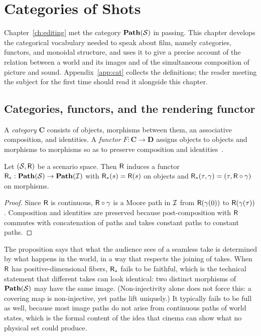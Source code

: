 \chapter{Categories of Shots}
\label{ch:categories}

Chapter~\ref{ch:editing} met the category $\mathbf{Path}(\mathcal{S})$ in passing. This chapter develops the categorical vocabulary needed to speak about film, namely categories, functors, and monoidal structure, and uses it to give a precise account of the relation between a world and its images and of the simultaneous composition of picture and sound. Appendix~\ref{app:cat} collects the definitions; the reader meeting the subject for the first time should read it alongside this chapter.

\section{Categories, functors, and the rendering functor}

A \emph{category} $\mathbf{C}$ consists of objects, morphisms between them, an associative composition, and identities. A \emph{functor} $F:\mathbf{C}\to\mathbf{D}$ assigns objects to objects and morphisms to morphisms so as to preserve composition and identities~\cite{maclane1998}.

\begin{proposition}\label{prop:rendering-functor}
Let $(\mathcal{S},\mathsf{R})$ be a scenario space. Then $\mathsf{R}$ induces a functor $\mathsf{R}_*:\mathbf{Path}(\mathcal{S})\to\mathbf{Path}(\mathcal{I})$ with $\mathsf{R}_*(s)=\mathsf{R}(s)$ on objects and $\mathsf{R}_*(\tau,\gamma)=(\tau,\mathsf{R}\circ\gamma)$ on morphisms.
\end{proposition}

\begin{proof}
Since $\mathsf{R}$ is continuous, $\mathsf{R}\circ\gamma$ is a Moore path in $\mathcal{I}$ from $\mathsf{R}(\gamma(0))$ to $\mathsf{R}(\gamma(\tau))$. Composition and identities are preserved because post-composition with $\mathsf{R}$ commutes with concatenation of paths and takes constant paths to constant paths.
\end{proof}

The proposition says that what the audience sees of a seamless take is determined by what happens in the world, in a way that respects the joining of takes. When $\mathsf{R}$ has positive-dimensional fibers, $\mathsf{R}_*$ fails to be faithful, which is the technical statement that different takes can look identical: two distinct morphisms of $\mathbf{Path}(\mathcal{S})$ may have the same image. (Non-injectivity alone does not force this: a covering map is non-injective, yet paths lift uniquely.) It typically fails to be full as well, because most image paths do not arise from continuous paths of world states, which is the formal content of the idea that cinema can show what no physical set could produce.

